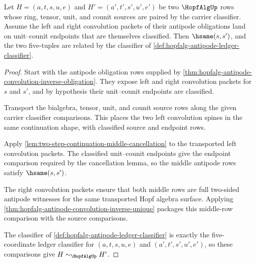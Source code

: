 \begin{theorem}
\label{thm:hopfalg-antipode-classifier-transport}
Let $H=(a,t,s,u,e)$ and $H'=(a',t',s',u',e')$ be two $\HopfAlgUp$ rows whose
ring, tensor, unit, and counit sources are paired by the carrier classifier.
Assume the left and right convolution packets of their antipode obligations
land on unit--counit endpoints that are themselves classified. Then
$\hsame(s,s')$, and the two five-tuples are related by the classifier of
\autoref{def:hopfalg-antipode-ledger-classifier}.
\end{theorem}
\begin{proof}
Start with the antipode obligation rows supplied by
\autoref{thm:hopfalg-antipode-convolution-inverse-obligation}. They expose
left and right convolution packets for $s$ and $s'$, and by hypothesis their
unit--counit endpoints are classified.

Transport the bialgebra, tensor, unit, and counit source rows along the given
carrier classifier comparisons. This places the two left convolution spines in
the same continuation shape, with classified source and endpoint rows.

Apply \autoref{lem:two-step-continuation-middle-cancellation} to the
transported left convolution packets. The classified unit--counit endpoints
give the endpoint comparison required by the cancellation lemma, so the
middle antipode rows satisfy $\hsame(s,s')$.

The right convolution packets ensure that both middle rows are full two-sided
antipode witnesses for the same transported Hopf algebra surface. Applying
\autoref{thm:hopfalg-antipode-convolution-inverse-unique} packages this
middle-row comparison with the source comparisons.

The classifier of \autoref{def:hopfalg-antipode-ledger-classifier} is exactly
the five-coordinate ledger classifier for $(a,t,s,u,e)$ and
$(a',t',s',u',e')$, so these comparisons give $H\sim_{\HopfAlgUp}H'$.
\end{proof}


